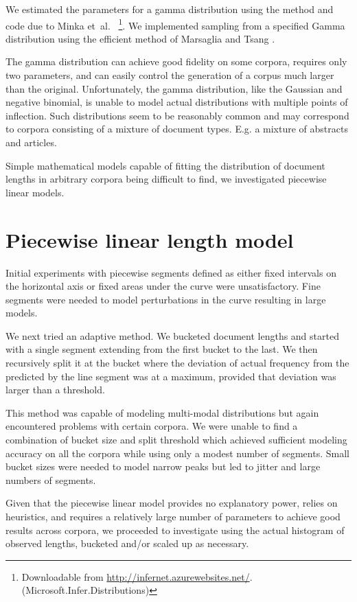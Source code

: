 \documentclass[11pt]{report}
\newcommand{\etal}{et~al.}
\begin{document}
We estimated the parameters for a gamma distribution using the method
and code due to Minka \etal~
\cite{Minka2002,InferNET14}\footnote{Downloadable from
  \url{http://infernet.azurewebsites.net/}. (Microsoft.Infer.Distributions)}.
We implemented sampling from
a specified Gamma distribution using the efficient method of Marsaglia
and Tsang \cite{MarsagliaTsangGamma2000}.

The gamma distribution can achieve good fidelity on some corpora,
requires only two parameters, and can easily control the generation of
a corpus much larger than the original.  Unfortunately, the gamma
distribution, like the Gaussian and negative binomial, is unable to
model actual distributions with multiple points of inflection. Such
distributions seem to be reasonably common and may correspond to
corpora consisting of a mixture of document types.  E.g. a mixture of
abstracts and articles.

Simple mathematical models capable of fitting the distribution of
document lengths in arbitrary corpora being difficult to find, we
investigated piecewise linear models.

\section{Piecewise linear length model}
Initial experiments with piecewise segments defined as either fixed
intervals on the horizontal axis or fixed areas under the curve were
unsatisfactory.  Fine segments were needed to model perturbations in
the curve resulting in large models.  

We next tried an adaptive method.  We bucketed document lengths and
started with a single segment extending from the first bucket to the
last.  We then recursively split it at the bucket where the deviation
of actual frequency from the predicted by the line segment was at a
maximum, provided that deviation was larger than a threshold.

This method was capable of modeling multi-modal distributions but
again encountered problems with certain corpora.  We were unable to
find a combination of bucket size and split threshold which achieved
sufficient modeling accuracy on all the corpora while using only a
modest number of segments.  Small bucket sizes were needed to model
narrow peaks but led to jitter and large numbers of segments.

Given that the piecewise linear model provides no explanatory power, relies on
heuristics, and requires a relatively large number of parameters to achieve 
good results across corpora, we proceeded to investigate using the actual histogram of
observed lengths, bucketed and/or scaled up as necessary.
 
\end{document}
